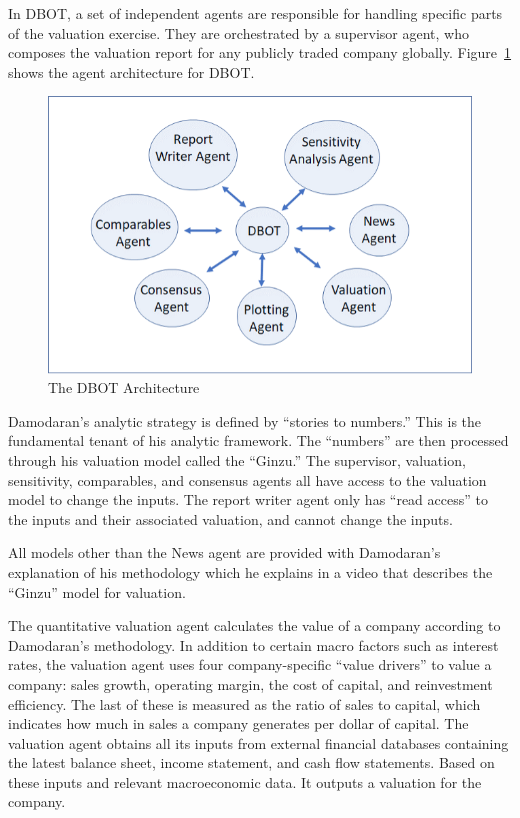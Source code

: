 \documentclass[]{interact}
\theoremstyle{plain}%
\theoremstyle{definition}
\theoremstyle{remark}
\begin{document}
In DBOT, a set of independent agents are responsible for handling specific parts of the valuation exercise. They are orchestrated by a supervisor agent, who composes the valuation report for any publicly traded company globally. 
Figure~\ref{fig:dbot-arch} shows the agent architecture for DBOT. 

\begin{figure}
    \centering
    \includegraphics[width=0.8\linewidth]{figures/dbot_arch.png}
    \caption{The DBOT Architecture}
    \label{fig:dbot-arch}
\end{figure}

Damodaran’s analytic strategy is defined by ``stories to numbers.'' This is the fundamental tenant of his analytic framework. The ``numbers'' are then processed through his valuation model called the ``Ginzu.'' The supervisor, valuation, sensitivity, comparables, and consensus agents all have access to the valuation model to change the inputs. The report writer agent only has ``read access'' to the inputs and their associated valuation, and cannot change the inputs. 

All models other than the News agent are provided with Damodaran’s explanation of his methodology which he explains in a video that describes the ``Ginzu'' model for valuation.

The quantitative valuation agent calculates the value of a company according to Damodaran’s methodology. In addition to certain macro factors such as interest rates, the valuation agent uses four company-specific ``value drivers'' to value a company: sales growth, operating margin, the cost of capital, and reinvestment efficiency. The last of these is measured as the ratio of sales to capital, which indicates how much in sales a company generates per dollar of capital. The valuation agent obtains all its inputs from external financial databases containing the latest balance sheet, income statement, and cash flow statements. Based on these inputs and relevant macroeconomic data. It outputs a valuation for the company. 
\end{document}
